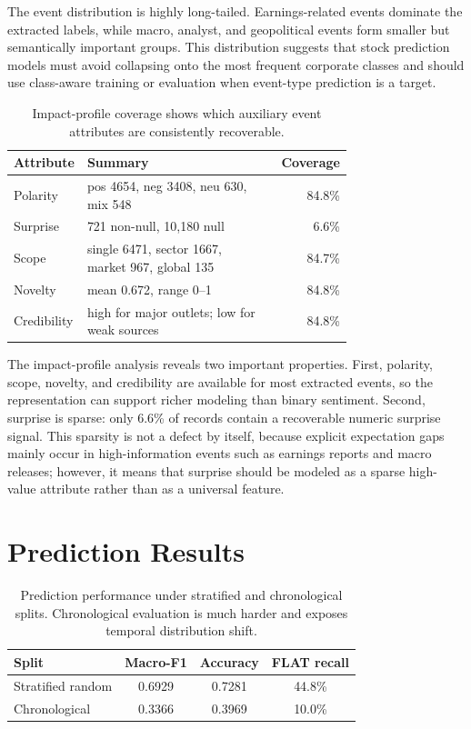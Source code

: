 \documentclass[sigconf,review]{acmart}
\begin{document}
The event distribution is highly long-tailed. Earnings-related events dominate the extracted labels, while macro, analyst, and geopolitical events form smaller but semantically important groups. This distribution suggests that stock prediction models must avoid collapsing onto the most frequent corporate classes and should use class-aware training or evaluation when event-type prediction is a target.

\begin{table}[t]
\caption{Impact-profile coverage shows which auxiliary event attributes are consistently recoverable.}
\label{tab:impact}
\centering
\small
\begin{tabular}{p{0.19\linewidth}p{0.55\linewidth}r}
\toprule
Attribute & Summary & Coverage \\
\midrule
Polarity & pos 4654, neg 3408, neu 630, mix 548 & 84.8\% \\
Surprise & 721 non-null, 10{,}180 null & 6.6\% \\
Scope & single 6471, sector 1667, market 967, global 135 & 84.7\% \\
Novelty & mean 0.672, range 0--1 & 84.8\% \\
Credibility & high for major outlets; low for weak sources & 84.8\% \\
\bottomrule
\end{tabular}
\end{table}

The impact-profile analysis reveals two important properties. First, polarity, scope, novelty, and credibility are available for most extracted events, so the representation can support richer modeling than binary sentiment. Second, surprise is sparse: only 6.6\% of records contain a recoverable numeric surprise signal. This sparsity is not a defect by itself, because explicit expectation gaps mainly occur in high-information events such as earnings reports and macro releases; however, it means that surprise should be modeled as a sparse high-value attribute rather than as a universal feature.

\section{Prediction Results}

\begin{table}[t]
\caption{Prediction performance under stratified and chronological splits. Chronological evaluation is much harder and exposes temporal distribution shift.}
\label{tab:main_results}
\centering
\small
\begin{tabular}{lccc}
\toprule
Split & Macro-F1 & Accuracy & FLAT recall \\
\midrule
Stratified random & 0.6929 & 0.7281 & 44.8\% \\
Chronological & 0.3366 & 0.3969 & 10.0\% \\
\bottomrule
\end{tabular}
\end{table}
\end{document}
